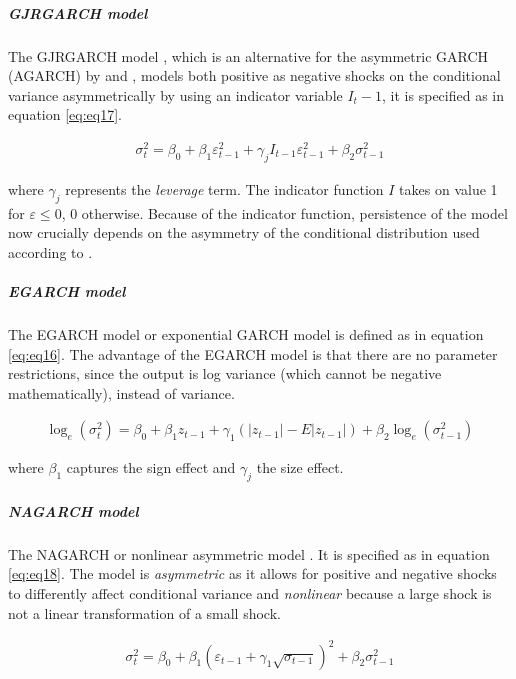 \documentclass[a4paper, nobind]{templates/ociamthesis}
\begin{document}
\hypertarget{gjrgarch-model}{%
\subparagraph{GJRGARCH model}\label{gjrgarch-model}}

\noindent The GJRGARCH model \autocite{glosten1993}, which is an alternative for the asymmetric GARCH (AGARCH) by \textcite{engle1990} and \textcite{engle1993}, models both positive as negative shocks on the conditional variance asymmetrically by using an indicator variable \(I_t-1\), it is specified as in equation \eqref{eq:eq17}.

\begin{align}
\sigma_t^2 = \beta_0 + \beta_1 \varepsilon_{t-1}^2 + \gamma_j I_{t-1} \varepsilon_{t-1}^2 + \beta_2 \sigma_{t-1}^2
 \label{eq:eq17}
\end{align}

\noindent where \(\gamma_j\) represents the \emph{leverage} term. The indicator function \(I\) takes on value 1 for \(\varepsilon \le 0\), 0 otherwise. Because of the indicator function, persistence of the model now crucially depends on the asymmetry of the conditional distribution used according to \textcite{ghalanos2020}.

\hypertarget{egarch-model}{%
\subparagraph{EGARCH model}\label{egarch-model}}

\noindent The EGARCH model or exponential GARCH model \autocite{nelson1991} is defined as in equation \eqref{eq:eq16}. The advantage of the EGARCH model is that there are no parameter restrictions, since the output is log variance (which cannot be negative mathematically), instead of variance.

\begin{align}
\log_e(\sigma_t^2) = \beta_0 + \beta_1 z_{t-1} + \gamma_1 (|z_{t-1}| - E|z_{t-1}|)+ \beta_2 \log_e(\sigma_{t-1}^2)
 \label{eq:eq16}
\end{align}

\noindent where \(\beta_1\) captures the sign effect and \(\gamma_j\) the size effect.

\hypertarget{nagarch-model}{%
\subparagraph{NAGARCH model}\label{nagarch-model}}

\noindent The NAGARCH or nonlinear asymmetric model \autocite{engle1993}. It is specified as in equation \eqref{eq:eq18}. The model is \emph{asymmetric} as it allows for positive and negative shocks to differently affect conditional variance and \emph{nonlinear} because a large shock is not a linear transformation of a small shock.

\begin{align}
\sigma_t^2 = \beta_0 + \beta_1 (\varepsilon_{t-1}+ \gamma_1 \sqrt{\sigma_{t-1}})^2 + \beta_2 \sigma_{t-1}^2
 \label{eq:eq18}
\end{align}
\end{document}
